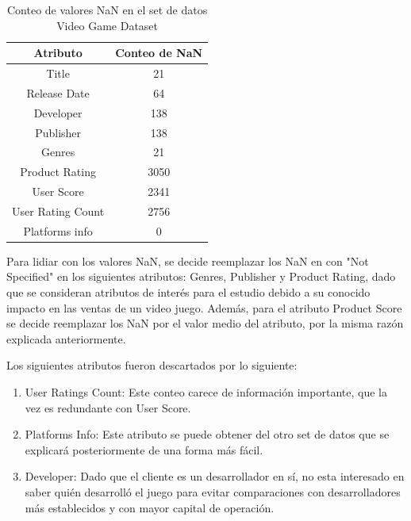 \documentclass[a4paper]{article}
\begin{document}
    \begin{table}[hbtp!]
        \centering
        \begin{tabular}{|c|c|}
            \hline
            \textbf{Atributo} & \textbf{Conteo de NaN}\\
            \hline
            Title & 21\\
            \hline
            Release Date & 64\\
            \hline
            Developer & 138\\
            \hline
            Publisher & 138\\
            \hline
            Genres & 21\\
            \hline
            Product Rating & 3050\\
            \hline
            User Score & 2341\\
            \hline
            User Rating Count & 2756\\
            \hline
            Platforms info & 0\\
            \hline
        \end{tabular}
        \caption{Conteo de valores NaN en el set de datos Video Game Dataset}
        \label{tab:conteo_nan_info_videojuegos}
    \end{table}

    Para lidiar con los valores NaN, se decide reemplazar los NaN en con "Not Specified" en los siguientes atributos: Genres, Publisher y Product Rating, dado que se consideran atributos de interés para el estudio debido a su conocido impacto en las ventas de un video juego. Adem\'{a}s, para el atributo Product Score se decide reemplazar los NaN por el valor medio del atributo, por la misma razón explicada anteriormente.

    Los siguientes atributos fueron descartados por lo siguiente:
    \begin{enumerate}
        \item User Ratings Count: Este conteo carece de información importante, que la vez es redundante con User Score.
        \item Platforms Info: Este atributo se puede obtener del otro set de datos que se explicará posteriormente de una forma más fácil.
        \item Developer: Dado que el cliente es un desarrollador en sí, no esta interesado en saber quién desarrolló el juego para evitar comparaciones con desarrolladores más establecidos y con mayor capital de operación.
    \end{enumerate}
\end{document}
